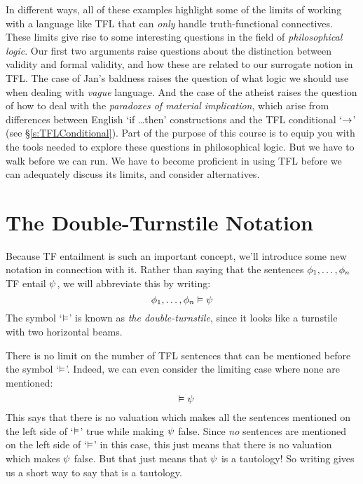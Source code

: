 In different ways, all of these examples highlight some of the limits of working with a language like TFL that can \emph{only} handle truth-functional connectives. These limits give rise to some interesting questions in the field of \emph{philosophical logic}.  Our first two arguments raise questions about the distinction between validity and formal validity, and how these are related to our surrogate notion in TFL.  The case of Jan's baldness raises the question of what logic we should use when dealing with \emph{vague} language. And the case of the atheist raises the question of how to deal with the \emph{paradoxes of material implication}, which arise from differences between English `if \ldots then' constructions and the TFL conditional `$\rightarrow$' (see \S\ref{s:TFLConditional}). Part of the purpose of this course is to equip you with the tools needed to explore these questions in philosophical logic. But we have to walk before we can run.  We have to become proficient in using TFL before we can adequately discuss its limits, and consider alternatives.


\section{The Double-Turnstile Notation}

Because TF entailment is such an important concept, we'll introduce some new notation in connection with it.  Rather than saying that the sentences $\mathcal{\phi}_1, \ldots, \mathcal{\phi}_n$ TF entail $\mathcal{\psi}$, we will abbreviate this by writing:
	$$\mathcal{\phi}_1, \ldots, \mathcal{\phi}_n \vDash \mathcal{\psi}$$
The symbol `$\vDash$' is known as \emph{the double-turnstile}, since it looks like a turnstile with two horizontal beams.

There is no limit on the number of TFL sentences that can be mentioned before the symbol `$\vDash$'. Indeed, we can even consider the limiting case where none are mentioned:
	$$\phantom{\meta{\phi}}\entails \meta{\psi}$$
This says that there is no valuation which makes all the sentences mentioned on the left side of `$\vDash$' true while making $\mathcal{\psi}$ false. Since \emph{no} sentences are mentioned on the left side of `$\vDash$' in this case, this just means that there is no valuation which makes $\mathcal{\psi}$ false. But that just means that $\mathcal{\psi}$ is a tautology!  So writing \entails \meta{\psi} gives us a short way to say that \meta{\psi} is a tautology. %

